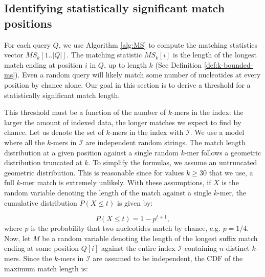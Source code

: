 \documentclass[unnumsec,webpdf,contemporary,large]{oup-authoring-template}%
\theoremstyle{thmstyleone}%
\theoremstyle{thmstyletwo}%
\theoremstyle{thmstylethree}%
\begin{document}
\subsection{Identifying statistically significant match positions}\label{sec:random-match-model}
For each query $Q$, we use Algorithm \ref{alg:MS} to compute the matching statistics vector $MS_k[1..|Q|]$. The matching statistic $MS_k[i]$ is the length of the longest match ending at position $i$ in $Q$, up to length $k$ (See Definition \ref{def:k-bounded-ms}). Even a random query will likely match some number of nucleotides at every position by chance alone. Our goal in this section is to derive a threshold for a statistically significant match length.

This threshold must be a function of the number of $k$-mers in the index: the larger the amount of indexed data, the longer matches we expect to find by chance. Let us denote the set of $k$-mers in the index with $\mathcal I$. We use a model where all the $k$-mers in $\mathcal I$ are independent random strings. The match length distribution at a given position against a single random $k$-mer follows a geometric distribution truncated at $k$. To simplify the formulas, we assume an untruncated geometric distribution. This is reasonable since for values $k \geq 30$ that we use, a full $k$-mer match is extremely unlikely. With these assumptions, if $X$ is the random variable denoting the length of the match against a single $k$-mer, the cumulative distribution $P(X \leq t)$ is given by:

\begin{equation}
    P\left(X \leq t\right) = 1 - p^{t + 1},
\label{geom-distribution}
\end{equation}
where $p$ is the probability that two nucleotides match by chance, e.g. $p = 1/4$. Now, let $M$ be a random variable denoting the length of the longest suffix match ending at some position $Q[i]$ against the entire index $\mathcal{I}$ containing $n$ distinct $k$-mers. Since the $k$-mers in $\mathcal I$ are assumed to be independent, the CDF of the maximum match length is:

\end{document}
